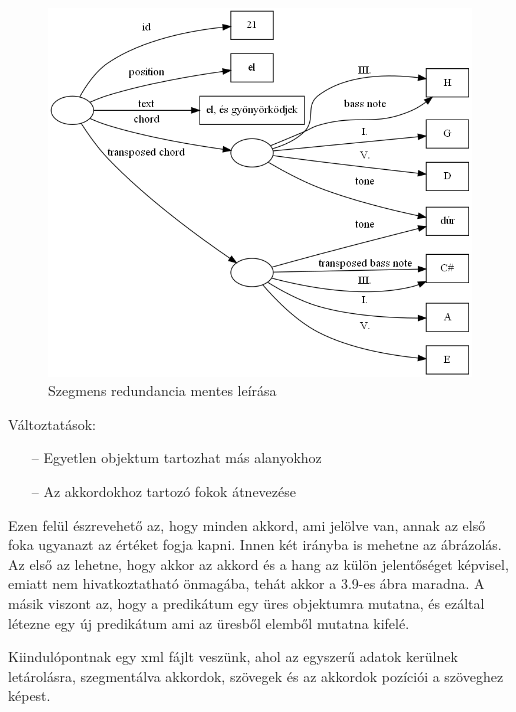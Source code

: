 \begin{figure}[h]
	\includegraphics[scale=0.5]{images/img_src/rdf_graph_7.png}
	\caption{Szegmens redundancia mentes leírása}
	\label{fig:graph7}
\end{figure}
\newpage
Változtatások:
\begin{itemize}
	\item[--] Egyetlen objektum tartozhat más alanyokhoz
	\item[--] Az akkordokhoz tartozó fokok átnevezése
\end{itemize}

Ezen felül észrevehető az, hogy minden akkord, ami jelölve van, annak az első foka ugyanazt az értéket fogja kapni. Innen két irányba is mehetne az ábrázolás. Az első az lehetne, hogy akkor az akkord és a hang az külön jelentőséget képvisel, emiatt nem hivatkoztatható önmagába, tehát akkor a 3.9-es ábra maradna. A másik viszont az, hogy a predikátum egy üres objektumra mutatna, és ezáltal létezne egy új predikátum ami az üresből elemből mutatna kifelé.


Kiindulópontnak egy xml fájlt veszünk, ahol az egyszerű adatok kerülnek letárolásra, szegmentálva akkordok, szövegek és az akkordok pozíciói a szöveghez képest. 

